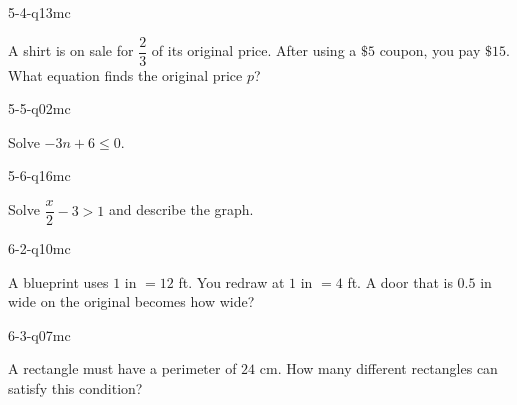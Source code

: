 \begin{practiceQuestion}{5-4-q13}{mc}
\begin{questionText}
A shirt is on sale for $\dfrac{2}{3}$ of its original price. After using a $\$5$ coupon, you pay $\$15$. What equation finds the original price $p$?
\end{questionText}
\end{practiceQuestion}

\begin{practiceQuestion}{5-5-q02}{mc}
\begin{questionText}
Solve $-3n + 6 \leq 0$.
\end{questionText}
\end{practiceQuestion}

\begin{practiceQuestion}{5-6-q16}{mc}
\begin{questionText}
Solve $\dfrac{x}{2} - 3 > 1$ and describe the graph.
\end{questionText}
\end{practiceQuestion}

\begin{practiceQuestion}{6-2-q10}{mc}
\begin{questionText}
A blueprint uses $1$ in $= 12$ ft. You redraw at $1$ in $= 4$ ft. A door that is $0.5$ in wide on the original becomes how wide?
\end{questionText}
\end{practiceQuestion}

\begin{practiceQuestion}{6-3-q07}{mc}
\begin{questionText}
A rectangle must have a perimeter of $24$ cm. How many different rectangles can satisfy this condition?
\end{questionText}
\end{practiceQuestion}

